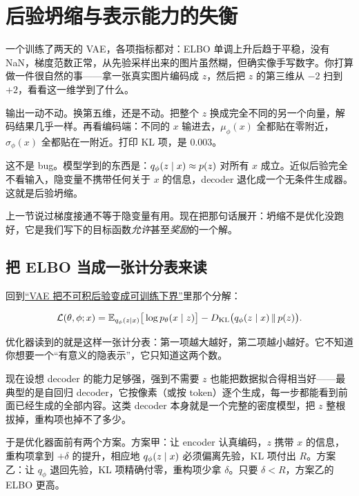 \section{后验坍缩与表示能力的失衡}
\label{sec:14-Deep-Learning/06-Variational-Autoencoders/03}

一个训练了两天的 VAE，各项指标都对：ELBO 单调上升后趋于平稳，没有 NaN，梯度范数正常，从先验采样出来的图片虽然糊，但确实像手写数字。你打算做一件很自然的事——拿一张真实图片编码成 \(z\)，然后把 \(z\) 的第三维从 \(-2\) 扫到 \(+2\)，看看这一维学到了什么。

输出一动不动。换第五维，还是不动。把整个 \(z\) 换成完全不同的另一个向量，解码结果几乎一样。再看编码端：不同的 \(x\) 输进去，\(\mu_\phi(x)\) 全都贴在零附近，\(\sigma_\phi(x)\) 全都贴在一附近。打印 KL 项，是 \(0.003\)。

这不是 bug。模型学到的东西是：\(q_\phi(z\mid x)\approx p(z)\) 对所有 \(x\) 成立。近似后验完全不看输入，隐变量不携带任何关于 \(x\) 的信息，decoder 退化成一个无条件生成器。这就是后验坍缩。

上一节说过梯度接通不等于隐变量有用。现在把那句话展开：坍缩不是优化没跑好，它是我们写下的目标函数\emph{允许}甚至\emph{奖励}的一个解。

\subsection{把 ELBO 当成一张计分表来读}

回到\hyperref[sec:14-Deep-Learning/06-Variational-Autoencoders/01]{``VAE 把不可积后验变成可训练下界''}里那个分解：

\[
\mathcal L(\theta,\phi;x) = \mathbb{E}_{q_\phi(z\mid x)}\big[\log p_\theta(x\mid z)\big] - D_{\mathrm{KL}}\big(q_\phi(z\mid x)\,\Vert\, p(z)\big).
\]

优化器读到的就是这样一张计分表：第一项越大越好，第二项越小越好。它不知道你想要一个``有意义的隐表示''，它只知道这两个数。

现在设想 decoder 的能力足够强，强到不需要 \(z\) 也能把数据拟合得相当好——最典型的是自回归 decoder，它按像素（或按 token）逐个生成，每一步都能看到前面已经生成的全部内容。这类 decoder 本身就是一个完整的密度模型，把 \(z\) 整根拔掉，重构项也掉不了多少。

于是优化器面前有两个方案。方案甲：让 encoder 认真编码，\(z\) 携带 \(x\) 的信息，重构项拿到 \(+\delta\) 的提升，相应地 \(q_\phi(z\mid x)\) 必须偏离先验，KL 项付出 \(R\)。方案乙：让 \(q_\phi\) 退回先验，KL 项精确付零，重构项少拿 \(\delta\)。只要 \(\delta < R\)，方案乙的 ELBO 更高。

